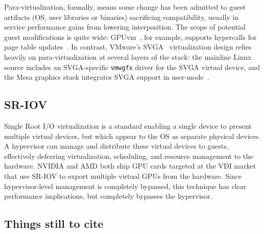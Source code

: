 Para-virtualization, formally, means some change has been admitted to guest
artifacts (OS, user libraries or binaries) sacrificing
compatibility, usually in service performance gains from lowering interposition.
The scope of potential guest modifications is quite wide:
GPUvm~\cite{GPUvm}, for example, supports hypercalls for page table updates~\cite{xen}.
In contrast, VMware's SVGA~\cite{dowty2009gpu} virtualization design relies heavily
on para-virtualization at several layers of the stack: the mainline
Linux source includes an SVGA-specific \texttt{vmwgfx} driver for the SVGA
virtual device, and the Mesa graphics stack integrates SVGA support
in user-mode~\cite{mesa}.

\subsection{SR-IOV}

Single Root I/O virtualization is a standard enabling a single device
to present multiple virtual devices, but which appear to the OS as separate
physical devices. A hypervisor can manage and distribute these virtual
devices to guests, effectively deferring virtualization, scheduling,
and resource management to the hardware. NVIDIA and AMD both ship
GPU cards targeted at the VDI market that use SR-IOV to export multiple
virtual GPUs from the hardware. Since hypervisor-level management is
completely bypassed, this technique has clear performance implications,
but completely bypasses the hypervisor.


\subsection{Things still to cite}

